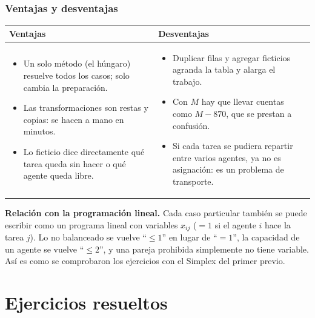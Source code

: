 \documentclass[11pt,a4paper]{article}
\begin{document}
\section{Ventajas y desventajas}

\begin{center}\small
\begin{tabular}{p{7.2cm}p{7.2cm}}
\toprule
\textbf{Ventajas} & \textbf{Desventajas} \\
\midrule
\begin{itemize}[leftmargin=*, itemsep=2pt, topsep=2pt]
  \item Un solo método (el húngaro) resuelve todos los casos; solo cambia la preparación.
  \item Las transformaciones son restas y copias: se hacen a mano en minutos.
  \item Lo ficticio dice directamente qué tarea queda sin hacer o qué agente queda libre.
\end{itemize}
&
\begin{itemize}[leftmargin=*, itemsep=2pt, topsep=2pt]
  \item Duplicar filas y agregar ficticios agranda la tabla y alarga el trabajo.
  \item Con $M$ hay que llevar cuentas como $M - 870$, que se prestan a confusión.
  \item Si cada tarea se pudiera repartir entre varios agentes, ya no es asignación: es un problema de transporte.
\end{itemize}
\\
\bottomrule
\end{tabular}
\end{center}

\enlargethispage{3\baselineskip}
\textbf{Relación con la programación lineal.} Cada caso particular también se puede escribir como un programa
lineal con variables $x_{ij}$ ($= 1$ si el agente $i$ hace la tarea $j$). Lo no balanceado se vuelve
``$\le 1$'' en lugar de ``$= 1$'', la capacidad de un agente se vuelve ``$\le 2$'', y una pareja prohibida
simplemente no tiene variable. Así es como se comprobaron los ejercicios con el Simplex del primer previo.

\newpage
\part{Ejercicios resueltos}
\setcounter{section}{0}
\end{document}
